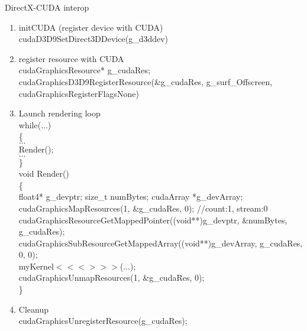 \begin{frame}
	{\tiny DirectX-CUDA interop}
	\begin{enumerate}\tiny
		\item initCUDA (register device with CUDA)\\
			{\color{blue}cudaD3D9SetDirect3DDevice}(g\_d3ddev)
		\item register resource with CUDA\\ 
			cudaGraphicsResource* {\color{red}g\_cudaRes};\\					
			{\color{blue}cudaGraphicsD3D9RegisterResource}(\&g\_cudaRes, g\_surf\_Offscreen, cudaGraphicsRegisterFlagsNone)
		\item Launch rendering loop\\
			while($\ldots$)						\\
			\{											\\
				\hspace{0.05in} $\ldots$						\\
				\hspace{0.05in} Render();					\\
				\hspace{0.05in} $\ldots$						\\
			\}											\\
			void Render()						\\
			\{											\\
				\hspace{0.05in} float4* g\_devptr; size\_t numBytes;	cudaArray *g\_devArray;\\
				\hspace{0.05in} {\color{blue}cudaGraphicsMapResources}(1, \&g\_cudaRes, 0); //count:1, stream:0 \\
				\hspace{0.05in} {\color{blue}cudaGraphicsResourceGetMappedPointer}((void**)g\_devptr, \&numBytes, g\_cudaRes); \\
				\hspace{0.05in} {\color{blue}cudaGraphicsSubResourceGetMappedArray}((void**)g\_devArray, g\_cudaRes, 0, 0);	\\
				\hspace{0.05in} {\color{green}myKernel}$<<<>>>$($\ldots$);	\\
				\hspace{0.05in} {\color{blue}cudaGraphicsUnmapResources}(1, \&g\_cudaRes, 0);\\
			\}
		\item Cleanup\\	
		{\color{blue}cudaGraphicsUnregisterResource}(g\_cudaRes);				
	\end{enumerate}
\end{frame}






